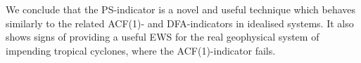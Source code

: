 \documentclass[doublecol]{epl2}
\begin{document}
We conclude that the PS-indicator is a novel and useful technique 
which behaves similarly to the related ACF(1)- and DFA-indicators 
in idealised systems. It also shows signs of providing a useful 
EWS for the real geophysical system of impending tropical cyclones, 
where the ACF(1)-indicator fails. 


\end{document}

